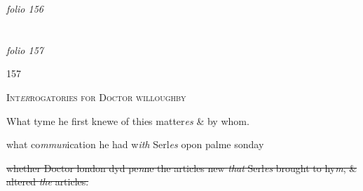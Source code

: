 \documentclass[12pt, a4paper]{book}
\begin{document}
\textit{folio 156}


         \vspace{4cm}
         
\dotfill
					  \section*{}  \subsection*{}

\textit{folio 157}



\begin{flushright}{\color{Mahogany}157}\end{flushright}

            		
				\begin{center} \begin{large} {\scshape Int\textit{er}rogatories for Doctor willoughby} \end{large} \end{center}
			



				\marginpar[\vspace{0.5cm}{\textcolor{Gray}{1}}]{}
			

		\ifthenelse{\isodd{\thepage}}
		{\reversemarginpar}
		{\normalmarginpar}
		What tyme he first knewe of thies matter\textit{es} \& by whom.



				\marginpar[\vspace{0.5cm}{\textcolor{Gray}{2}}]{}
			
	
		\ifthenelse{\isodd{\thepage}}
		{\reversemarginpar}
		{\normalmarginpar}
		what co\textit{mmun}ication he had w\textit{ith} Serl\textit{es} opon palme sonday



			
	
		\ifthenelse{\isodd{\thepage}}
		{\reversemarginpar}
		{\normalmarginpar}
		\sout{whether Doctor london dyd pe\textit{n}ne the articles new
 \textit{that} Serl\textit{es} brought to hy\textit{m}, \& altered \textit{the} articles.}


	
			
\end{document}
